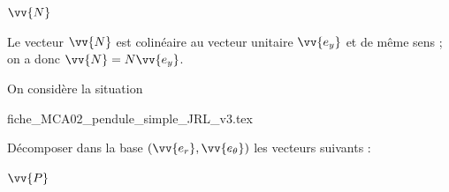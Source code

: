 \begin{enonce}
	$\vv{N}$
\end{enonce}


\begin{corrige}
Le vecteur $\vv{N}$ est colinéaire au vecteur unitaire $\vv{e_y}$ et de même sens ; on a donc $\vv{N} = N \vv{e_y}$.
\end{corrige}

\finEntrainement









\hauteurLargeurCadreReponse		{9mm}{4.75cm}
\initialisationEntrainement


On considère la situation 
\begin{center}
{fiche_MCA02_pendule_simple_JRL_v3.tex}
\end{center}

Décomposer dans la base $(\vv{e_r}, \vv{e_\theta})$ les vecteurs suivants : 

\debutEntrainement

\begin{enonce}
	$\vv{P}$
\end{enonce}


